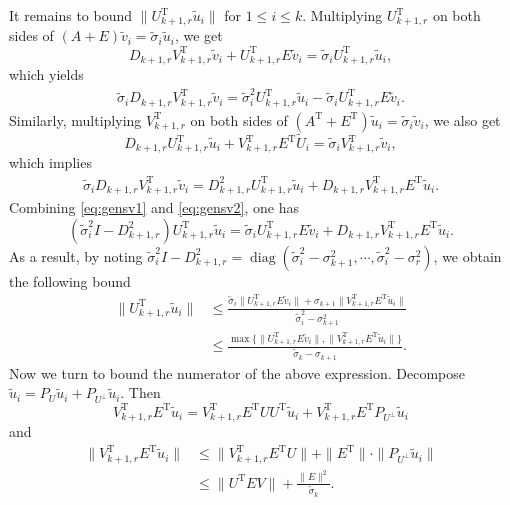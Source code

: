 \documentclass[reqno]{amsart}
\DeclareMathOperator{\diag}{diag}
\newcommand{\T}{\mathrm{T}}
\theoremstyle{plain}
\theoremstyle{definition}
\begin{document}
It remains to bound $\| U_{k+1,r}^\T {\widetilde u_i}\|$ for $1\le i \le k$. Multiplying $U_{k+1,r}^\T$ on both sides of $(A+E)\widetilde v_i =\widetilde \sigma_i \widetilde u_i$, we get
$$
D_{k+1,r} V_{k+1,r}^\T \widetilde v_i + U_{k+1,r}^\T E \widetilde v_i =\widetilde \sigma_i U_{k+1,r}^\T \widetilde u_i,
$$
which yields 
\begin{align}\label{eq:gensv1}
\widetilde \sigma_i D_{k+1,r} V_{k+1,r}^\T \widetilde v_i = \widetilde \sigma_i^2 U_{k+1,r}^\T \widetilde u_i - \widetilde \sigma_i U_{k+1,r}^\T E \widetilde v_i.
\end{align}
Similarly, multiplying $V_{k+1,r}^\T$ on both sides of $(A^\T+E^\T)\widetilde u_i =\widetilde \sigma_i \widetilde v_i$, we also get
$$
D_{k+1,r} U_{k+1,r}^\T \widetilde u_i + V_{k+1,r}^\T E^\T \widetilde U_i =\widetilde \sigma_i V_{k+1,r}^\T \widetilde v_i,
$$
which implies
\begin{align}\label{eq:gensv2}
\widetilde \sigma_i D_{k+1,r} V_{k+1,r}^\T \widetilde v_i =D_{k+1,r}^2 U_{k+1,r}^\T \widetilde u_i + D_{k+1,r}V_{k+1,r}^\T E^\T \widetilde u_i.
\end{align}
Combining \eqref{eq:gensv1} and \eqref{eq:gensv2}, one has
$$(\widetilde \sigma_i^2 I - D_{k+1,r}^2) U_{k+1,r}^\T \widetilde u_i  = \widetilde \sigma_i U_{k+1,r}^\T E \widetilde v_i + D_{k+1,r}V_{k+1,r}^\T E^\T \widetilde u_i.$$
As a result, by noting $\widetilde \sigma_i^2 I - D_{k+1,r}^2=\diag(\widetilde \sigma_i^2-\sigma_{k+1}^2,\cdots, \widetilde \sigma_i^2-\sigma_{r}^2)$, we obtain the following bound
\begin{align}\label{eq:genui}
\|U_{k+1,r}^\T \widetilde u_i \| &\le \frac{\widetilde \sigma_i \| U_{k+1,r}^\T E \widetilde v_i\| + \sigma_{k+1}\|V_{k+1,r}^\T E^\T \widetilde u_i\| }{\widetilde \sigma_i^2-\sigma_{k+1}^2}\nonumber\\
&\le \frac{ \max\{ \| U_{k+1,r}^\T E \widetilde v_i\|,\|V_{k+1,r}^\T E^\T \widetilde u_i\| \} }{\widetilde \sigma_k-\sigma_{k+1}}.
\end{align}
Now we turn to bound the numerator of the above expression. Decompose 
$\widetilde u_i = P_U \widetilde u_i +  P_{U^\perp} \widetilde u_i$. Then $$V_{k+1,r}^\T E^\T \widetilde u_i = V_{k+1,r}^\T E^\T U U^\T\widetilde u_i +  V_{k+1,r}^\T E^\T  P_{U^\perp} \widetilde u_i$$
and 
\begin{align*}
\| V_{k+1,r}^\T E^\T \widetilde u_i \| &\le \| V_{k+1,r}^\T E^\T U \|  +  \| E^\T \| \cdot\| P_{U^\perp} \widetilde u_i\|\\
&\le \|U^\T E V\| + \frac{\|E\|^2}{\widetilde \sigma_k}.
\end{align*}
\end{document}
